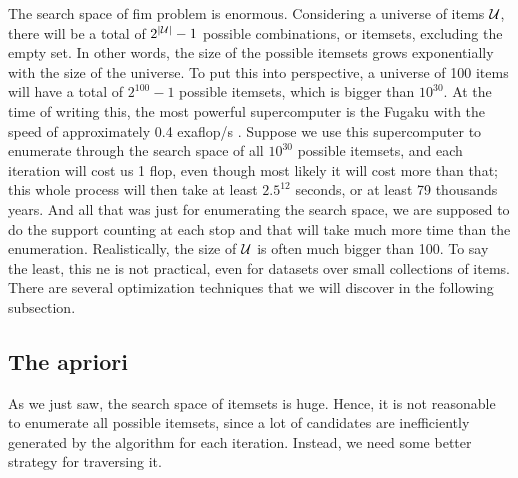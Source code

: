 The search space of \acl{fim} problem is enormous.
Considering a universe of items $\mathcal{U}$, there will be a total of $2^{\left\lvert \mathcal{U} \right\rvert} - 1$ possible combinations, or itemsets, excluding the empty set.
In other words, the size of the possible itemsets grows exponentially with the size of the universe.
To put this into perspective, a universe of 100 items will have a total of $2^{100} - 1$ possible itemsets, which is bigger than $10^{30}$.
At the time of writing this, the most powerful supercomputer is the Fugaku with the speed of approximately 0.4 exaflop/s \citep{monroe_fugaku_2020}.
Suppose we use this supercomputer to enumerate through the search space of all $10^{30}$ possible itemsets, and each iteration will cost us 1 flop, even though most likely it will cost more than that; this whole process will then take at least $2.5^{12}$ seconds, or at least 79 thousands years.
And all that was just for enumerating the search space, we are supposed to do the support counting at each stop and that will take much more time than the enumeration.
Realistically, the size of $\mathcal{U}$ is often much bigger than 100.
To say the least, this \acl{ne} is not practical, even for datasets over small collections of items.
There are several optimization techniques that we will discover in the following subsection.

\subsection{The \acl{apriori}}
\label{sub:apriori}
As we just saw, the search space of itemsets is huge.
Hence, it is not reasonable to enumerate all possible itemsets, since a lot of candidates are inefficiently generated by the algorithm for each iteration.
Instead, we need some better strategy for traversing it.


